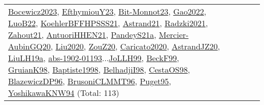 {\begin{longtable}{p{3cm}r>{\raggedright\arraybackslash}p{6cm}>{\raggedright\arraybackslash}p{6cm}>{\raggedright\arraybackslash}p{8cm}}
\hyperref[detail:Bocewicz2023]{Bocewicz2023}, \hyperref[detail:EfthymiouY23]{EfthymiouY23}, \hyperref[detail:Bit-Monnot23]{Bit-Monnot23}, \hyperref[detail:Gao2022]{Gao2022}, \hyperref[detail:LuoB22]{LuoB22}, \hyperref[detail:KoehlerBFFHPSSS21]{KoehlerBFFHPSSS21}, \hyperref[detail:Astrand21]{Astrand21}, \hyperref[detail:Radzki2021]{Radzki2021}, \hyperref[detail:Zahout21]{Zahout21}, \hyperref[detail:AntuoriHHEN21]{AntuoriHHEN21}, \hyperref[detail:PandeyS21a]{PandeyS21a}, \hyperref[detail:Mercier-AubinGQ20]{Mercier-AubinGQ20}, \hyperref[detail:Liu2020]{Liu2020}, \hyperref[detail:ZouZ20]{ZouZ20}, \hyperref[detail:Caricato2020]{Caricato2020}, \hyperref[detail:AstrandJZ20]{AstrandJZ20}, \hyperref[detail:LiuLH19a]{LiuLH19a}, \hyperref[detail:abs-1902-01193]{abs-1902-01193}...\hyperref[detail:JoLLH99]{JoLLH99}, \hyperref[detail:BeckF99]{BeckF99}, \hyperref[detail:GruianK98]{GruianK98}, \hyperref[detail:Baptiste1998]{Baptiste1998}, \hyperref[detail:BelhadjiI98]{BelhadjiI98}, \hyperref[detail:CestaOS98]{CestaOS98}, \hyperref[detail:BlazewiczDP96]{BlazewiczDP96}, \hyperref[detail:BrusoniCLMMT96]{BrusoniCLMMT96}, \hyperref[detail:Puget95]{Puget95}, \hyperref[detail:YoshikawaKNW94]{YoshikawaKNW94} (Total: 113)\\

\end{longtable}}

